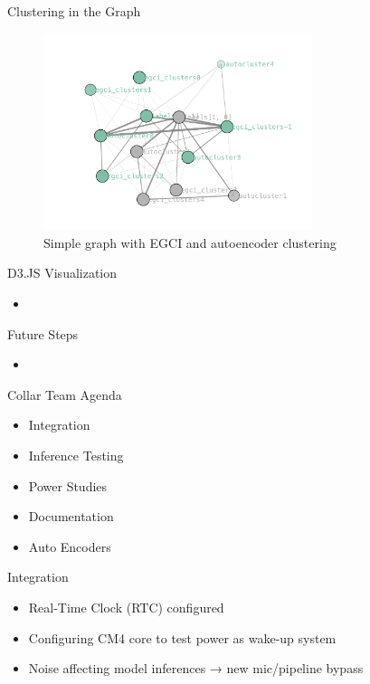 \begin{frame}{Clustering in the Graph}
    \begin{figure}
        \centering
        \includegraphics[height=0.7\textheight,width=0.7\textwidth,keepaspectratio]{images/graph_clustering.png}
        \caption{Simple graph with EGCI and autoencoder clustering}
    \end{figure}
    
\end{frame}

\begin{frame}{D3.JS Visualization}
    \begin{itemize}
        \item 
    \end{itemize}
\end{frame}

\begin{frame}{Future Steps}
    \begin{itemize}
        \item 
    \end{itemize}
\end{frame}

\begin{frame}{Collar Team Agenda}
    \begin{itemize}
        \item Integration
        \item Inference Testing
        \item Power Studies
        \item Documentation
        \item Auto Encoders       
    \end{itemize}
\end{frame}

\begin{frame}{Integration}
    \begin{itemize}
        \item Real-Time Clock (RTC) configured
        \item Configuring CM4 core to test power as wake-up system
        \item Noise affecting model inferences → new mic/pipeline bypass
    \end{itemize}
\end{frame}

